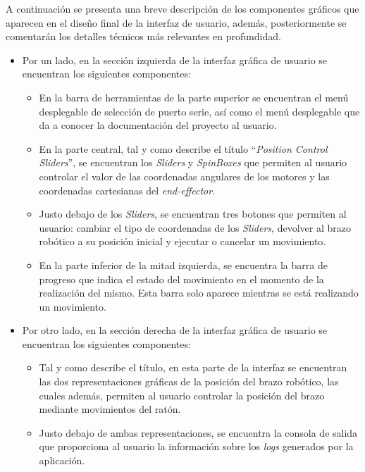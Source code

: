 A continuación se presenta una breve descripción de los componentes gráficos que aparecen en el diseño final de la interfaz de usuario, además, posteriormente se comentarán los detalles técnicos más relevantes en profundidad.
\begin{itemize}
    \item Por un lado, en la sección izquierda de la interfaz gráfica de usuario se encuentran los siguientes componentes:
    \begin{itemize}
        \item En la barra de herramientas de la parte superior se encuentran el menú desplegable de selección de puerto serie, así como el menú desplegable que da a conocer la documentación del proyecto al usuario.
        \item En la parte central, tal y como describe el título ``\textit{Position Control Sliders}'', se encuentran los \textit{Sliders} y \textit{SpinBoxes} que permiten al usuario controlar el valor de las coordenadas angulares de los motores y las coordenadas cartesianas del \textit{end-effector}.
        \item Justo debajo de los \textit{Sliders}, se encuentran tres botones que permiten al usuario: cambiar el tipo de coordenadas de los \textit{Sliders}, devolver al brazo robótico a su posición inicial y ejecutar o cancelar un movimiento.
        \item En la parte inferior de la mitad izquierda, se encuentra la barra de progreso que indica el estado del movimiento en el momento de la realización del mismo. Esta barra solo aparece mientras se está realizando un movimiento.
    \end{itemize}
    \item Por otro lado, en la sección derecha de la interfaz gráfica de usuario se encuentran los siguientes componentes:
    \begin{itemize}
        \item Tal y como describe el título, en esta parte de la interfaz se encuentran las dos representaciones gráficas de la posición del brazo robótico, las cuales además, permiten al usuario controlar la posición del brazo mediante movimientos del ratón.
        \item Justo debajo de ambas representaciones, se encuentra la consola de salida que proporciona al usuario la información sobre los \textit{logs} generados por la aplicación.
    \end{itemize}
\end{itemize}

